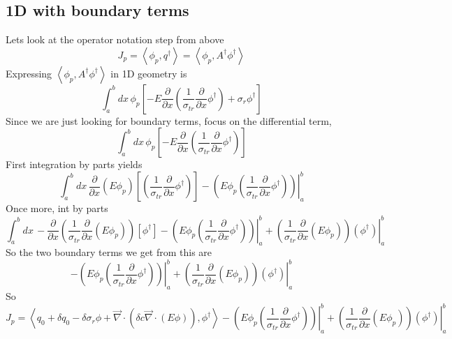 \documentclass{article}
\newcommand{\bra}{\left\langle}
\newcommand{\ket}{\right\rangle}
\newcommand{\vdiv}{\vec{\nabla} \cdot}
\newcommand{\pdx}{\frac{\partial}{\partial x}}
\begin{document}
\subsection{1D with boundary terms}
Lets look at the operator notation step from above
\[
J_p = \bra \phi_p , q^\dag \ket = \bra \phi_p , A^\dag \phi^\dag\ket
\]
Expressing $\bra \phi_p , A^\dag \phi^\dag\ket$ in 1D geometry is
\[\int_a^b dx \, \phi_p \left[ - E  \pdx \left( \frac{1}{\sigma_{tr}} \pdx \phi^\dag \right) 
+ \sigma_r \phi^\dag \right]
\]
Since we are just looking for boundary terms, focus on the differential term,
\[\int_a^b dx \, \phi_p \left[ - E  \pdx \left( \frac{1}{\sigma_{tr}} \pdx \phi^\dag \right) \right]
\]
First integration by parts yields
\[\int_a^b dx \, \pdx \left( E \phi_p \right) \left[ \left( \frac{1}{\sigma_{tr}} \pdx \phi^\dag \right) \right] - \left. \left( E \phi_p   \left( \frac{1}{\sigma_{tr}} \pdx \phi^\dag \right) \right)  \right|_a^b
\]
Once more, int by parts
\[\int_a^b dx \,   - \pdx \left( \frac{1}{\sigma_{tr}} \pdx \left( E \phi_p \right) \right)  \left[ \phi^\dag \right] - \left. \left( E \phi_p   \left( \frac{1}{\sigma_{tr}} \pdx \phi^\dag \right) \right)  \right|_a^b + \left. \left( \frac{1}{\sigma_{tr}} \pdx \left( E \phi_p \right) \right) (\phi^\dag) \right|_a^b 
\]
So the two boundary terms we get from this are
\[
- \left. \left( E \phi_p   \left( \frac{1}{\sigma_{tr}} \pdx \phi^\dag \right) \right)  \right|_a^b + \left. \left( \frac{1}{\sigma_{tr}} \pdx \left( E \phi_p \right) \right) (\phi^\dag) \right|_a^b
\]
So
\[
J_p = \bra q_0 + \delta q_0 - \delta \sigma_r \phi + \vdiv \left( \delta c \vdiv \left( E \phi \right) \right), \phi^\dag \ket - \left. \left( E \phi_p   \left( \frac{1}{\sigma_{tr}} \pdx \phi^\dag \right) \right)  \right|_a^b + \left. \left( \frac{1}{\sigma_{tr}} \pdx \left( E \phi_p \right) \right) (\phi^\dag) \right|_a^b
\]
\end{document}
